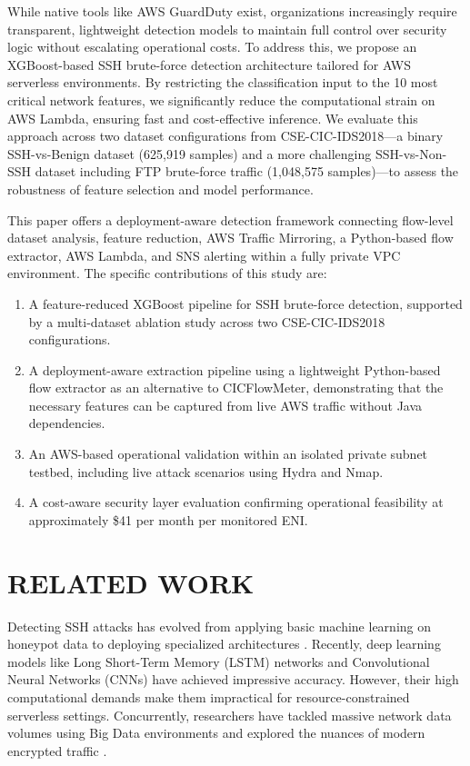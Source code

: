 \documentclass[conference]{IEEEtran}
\begin{document}
While native tools like AWS GuardDuty exist, organizations increasingly require transparent, lightweight detection models to maintain full control over security logic without escalating operational costs. To address this, we propose an XGBoost-based SSH brute-force detection architecture tailored for AWS serverless environments. By restricting the classification input to the 10 most critical network features, we significantly reduce the computational strain on AWS Lambda, ensuring fast and cost-effective inference. We evaluate this approach across two dataset configurations from CSE-CIC-IDS2018---a binary SSH-vs-Benign dataset (625,919 samples) and a more challenging SSH-vs-Non-SSH dataset including FTP brute-force traffic (1,048,575 samples)---to assess the robustness of feature selection and model performance.

This paper offers a deployment-aware detection framework connecting flow-level dataset analysis, feature reduction, AWS Traffic Mirroring, a Python-based flow extractor, AWS Lambda, and SNS alerting within a fully private VPC environment. The specific contributions of this study are:
\begin{enumerate}
\item A feature-reduced XGBoost pipeline for SSH brute-force detection, supported by a multi-dataset ablation study across two CSE-CIC-IDS2018 configurations.
\item A deployment-aware extraction pipeline using a lightweight Python-based flow extractor as an alternative to CICFlowMeter, demonstrating that the necessary features can be captured from live AWS traffic without Java dependencies.
\item An AWS-based operational validation within an isolated private subnet testbed, including live attack scenarios using Hydra and Nmap.
\item A cost-aware security layer evaluation confirming operational feasibility at approximately \$41 per month per monitored ENI.
\end{enumerate}


\section{RELATED WORK}

Detecting SSH attacks has evolved from applying basic machine learning on honeypot data \cite{b1, b2} to deploying specialized architectures \cite{b3, b7, b13}. Recently, deep learning models like Long Short-Term Memory (LSTM) networks \cite{b4} and Convolutional Neural Networks (CNNs) \cite{b6} have achieved impressive accuracy. However, their high computational demands make them impractical for resource-constrained serverless settings. Concurrently, researchers have tackled massive network data volumes using Big Data environments \cite{b5, b8} and explored the nuances of modern encrypted traffic \cite{b9, b10}.
\end{document}
